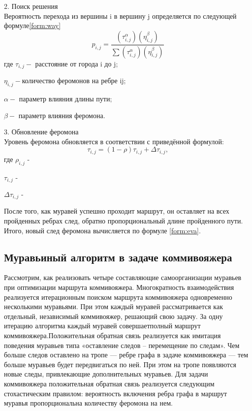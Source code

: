 \documentclass[a4paper, 12pt]{article}
\begin{document}
	\hspace*{-5mm}2. Поиск решения  \\
	Вероятность перехода из вершины i в вершину j определяется по следующей формуле\ref{form:way}\\   
	\begin{equation}\label{form:way} 
		p_{i,j}={\frac {(\tau _{i,j}^{\alpha })(\eta _{i,j}^{\beta })}{\sum (\tau _{i,j}^{\alpha })(\eta _{i,j}^{\beta })}}
	\end{equation}
	где \quad$ \tau _{i,j} - $ расстояние от города i до j;
	
	$\eta _{i,j} - $количество феромонов на ребре ij;
	
	$\alpha - $ параметр влияния длины пути;
	
	$\beta - $ параметр влияния феромона.
	
	
	\hspace*{-5mm}3. Обновление феромона \\
	Уровень феромона обновляется в соответствии с приведённой формулой:\\
	\begin{equation}\label{form:eva} 
		\tau _{i,j}=(1-\rho )\tau _{i,j}+\Delta \tau _{i,j},
	\end{equation}
	где \quad$ \rho _{i,j}$ -  
	
	$\tau _{i,j}$ -  
	
	$\Delta \tau _{i,j}$ - 
	
	После того, как муравей успешно проходит маршрут, он оставляет на всех пройденных ребрах след, обратно пропорциональный длине пройденного пути. Итого, новый след феромона вычисляется по формуле \ref{form:eva}.
	\subsection{Муравьиный алгоритм в задаче коммивояжера}
	\hspace*{5mm} Рассмотрим, как реализовать четыре составляющие самоорганизации муравьев при оптимизации маршрута коммивояжера. Многократность взаимодействия реализуется итерационным поиском маршрута коммивояжера одновременно несколькими муравьями. При этом каждый муравей рассматривается как отдельный, независимый коммивояжер, решающий свою задачу. За одну итерацию алгоритма каждый муравей совершаетполный маршрут коммивояжера.Положительная обратная связь реализуется как имитация поведения муравьев типа «оставление следов – перемещение по следам». Чем больше следов оставлено на тропе — ребре графа в задаче коммивояжера  — тем больше муравьев будет передвигаться по ней. При этом на тропе появляются новые следы, привлекающие дополнительных муравьев. Для задачи коммивояжера положительная обратная связь реализуется следующим стохастическим правилом: вероятность включения ребра графа в маршрут муравья пропорциональна количеству феромона на нем.
	
\end{document}
